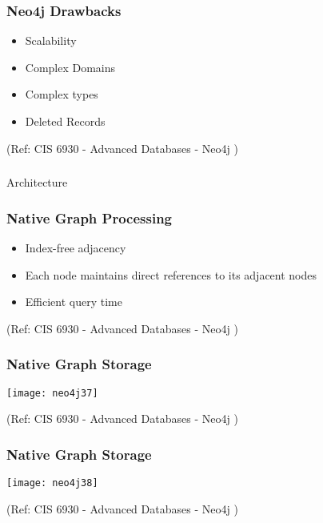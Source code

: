 \begin{frame}\frametitle{Neo4j Drawbacks}


\begin{itemize}
\item  Scalability
\item   Complex Domains
\item   Complex types
\item   Deleted Records
\end{itemize}

 

{\tiny (Ref: CIS 6930 - Advanced Databases - Neo4j )}
\end{frame}

\begin{frame}[fragile]\frametitle{}
\begin{center}
{\Large Architecture}
\end{center}
\end{frame}

\begin{frame}\frametitle{Native Graph Processing}



\begin{itemize}
\item Index-free adjacency
\item Each node maintains direct references to its adjacent nodes
\item Efficient query time
\end{itemize}

{\tiny (Ref: CIS 6930 - Advanced Databases - Neo4j )}
\end{frame}

\begin{frame}\frametitle{Native Graph Storage}

\begin{center}
\texttt{[image: neo4j37]}
\end{center}	  


{\tiny (Ref: CIS 6930 - Advanced Databases - Neo4j )}
\end{frame}

\begin{frame}\frametitle{Native Graph Storage}

\begin{center}
\texttt{[image: neo4j38]}
\end{center}	  


{\tiny (Ref: CIS 6930 - Advanced Databases - Neo4j )}
\end{frame}


